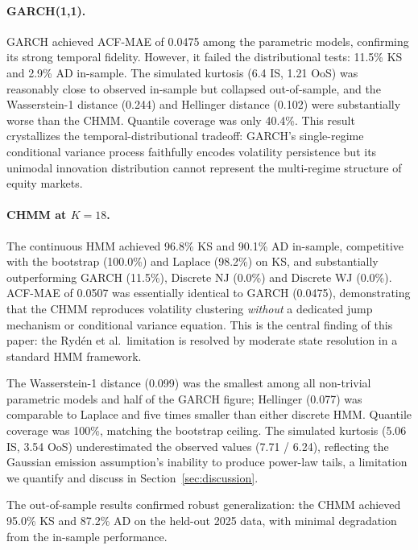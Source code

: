 \paragraph{GARCH(1,1).}
GARCH achieved ACF-MAE of 0.0475 among the parametric models, confirming its strong temporal fidelity.
However, it failed the distributional tests: 11.5\% KS and 2.9\% AD in-sample.
The simulated kurtosis (6.4 IS, 1.21 OoS) was reasonably close to observed in-sample but collapsed out-of-sample, and the Wasserstein-1 distance (0.244) and Hellinger distance (0.102) were substantially worse than the CHMM.
Quantile coverage was only 40.4\%.
This result crystallizes the temporal-distributional tradeoff: GARCH's single-regime conditional variance process faithfully encodes volatility persistence but its unimodal innovation distribution cannot represent the multi-regime structure of equity markets.

\paragraph{CHMM at $K = 18$.}
The continuous HMM achieved 96.8\% KS and 90.1\% AD in-sample, competitive with the bootstrap (100.0\%) and Laplace (98.2\%) on KS, and substantially outperforming GARCH (11.5\%), Discrete NJ (0.0\%) and Discrete WJ (0.0\%).
ACF-MAE of 0.0507 was essentially identical to GARCH (0.0475), demonstrating that the CHMM reproduces volatility clustering \emph{without} a dedicated jump mechanism or conditional variance equation.
This is the central finding of this paper: the Ryd\'{e}n et al.\ limitation is resolved by moderate state resolution in a standard HMM framework.

The Wasserstein-1 distance (0.099) was the smallest among all non-trivial parametric models and half of the GARCH figure; Hellinger (0.077) was comparable to Laplace and five times smaller than either discrete HMM.
Quantile coverage was 100\%, matching the bootstrap ceiling.
The simulated kurtosis (5.06 IS, 3.54 OoS) underestimated the observed values (7.71 / 6.24), reflecting the Gaussian emission assumption's inability to produce power-law tails, a limitation we quantify and discuss in Section~\ref{sec:discussion}.

The out-of-sample results confirmed robust generalization: the CHMM achieved 95.0\% KS and 87.2\% AD on the held-out 2025 data, with minimal degradation from the in-sample performance.

